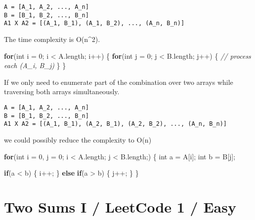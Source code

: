 \documentclass[]{book}
\newenvironment{Shaded}{\begin{snugshade}}{\end{snugshade}}
\newcommand{\CommentTok}[1]{\textcolor[rgb]{0.56,0.35,0.01}{\textit{#1}}}
\newcommand{\DataTypeTok}[1]{\textcolor[rgb]{0.13,0.29,0.53}{#1}}
\newcommand{\DecValTok}[1]{\textcolor[rgb]{0.00,0.00,0.81}{#1}}
\newcommand{\FunctionTok}[1]{\textcolor[rgb]{0.00,0.00,0.00}{#1}}
\newcommand{\KeywordTok}[1]{\textcolor[rgb]{0.13,0.29,0.53}{\textbf{#1}}}
\newcommand{\NormalTok}[1]{#1}
\begin{document}
\begin{verbatim}
A = [A_1, A_2, ..., A_n]
B = [B_1, B_2, ..., B_n]
A1 X A2 = [(A_1, B_1), (A_1, B_2), ..., (A_n, B_n)]
\end{verbatim}

The time complexity is O(n\^{}2).

\begin{Shaded}
\begin{Highlighting}[]
\KeywordTok{for}\NormalTok{(}\DataTypeTok{int}\NormalTok{ i = }\DecValTok{0}\NormalTok{; i < A.}\FunctionTok{length}\NormalTok{; i++) \{}
    \KeywordTok{for}\NormalTok{(}\DataTypeTok{int}\NormalTok{ j = }\DecValTok{0}\NormalTok{; j < B.}\FunctionTok{length}\NormalTok{; j++) \{}
        \CommentTok{// process each (A_i, B_j)}
\NormalTok{    \}}
\NormalTok{\}}
\end{Highlighting}
\end{Shaded}

If we only need to enumerate part of the combination over two arrays while traversing both arrays simultaneously.

\begin{verbatim}
A = [A_1, A_2, ..., A_n]
B = [B_1, B_2, ..., B_n]
A1 X A2 = [(A_1, B_1), (A_2, B_1), (A_2, B_2), ..., (A_n, B_n)]
\end{verbatim}

we could possibly reduce the complexity to O(n)

\begin{Shaded}
\begin{Highlighting}[]
\KeywordTok{for}\NormalTok{(}\DataTypeTok{int}\NormalTok{ i = }\DecValTok{0}\NormalTok{, j = }\DecValTok{0}\NormalTok{; i < A.}\FunctionTok{length}\NormalTok{; j < B.}\FunctionTok{length}\NormalTok{;) \{}
    \DataTypeTok{int}\NormalTok{ a = A[i];}
    \DataTypeTok{int}\NormalTok{ b = B[j];}

    \KeywordTok{if}\NormalTok{(a < b) \{}
\NormalTok{        i++;}
\NormalTok{    \} }\KeywordTok{else} \KeywordTok{if}\NormalTok{(a > b) \{}
\NormalTok{        j++;}
\NormalTok{    \}}
\NormalTok{\}}
\end{Highlighting}
\end{Shaded}

\hypertarget{two-sums-i-leetcode-1-easy}{%
\section{Two Sums I / LeetCode 1 / Easy}\label{two-sums-i-leetcode-1-easy}}
\end{document}

